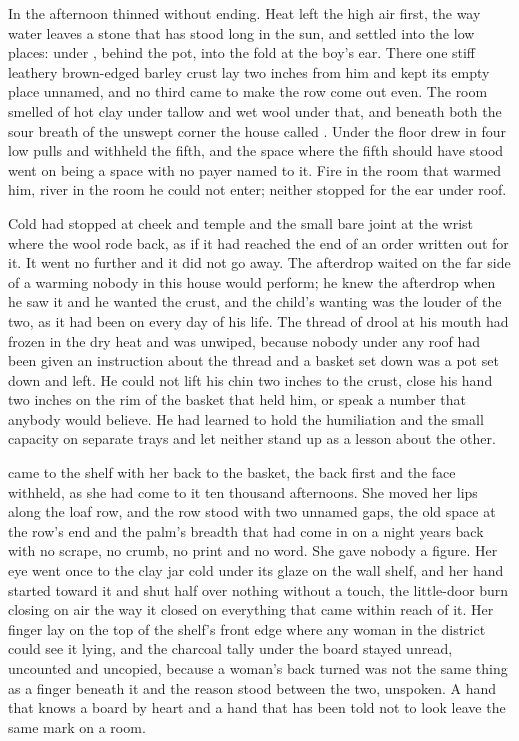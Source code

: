 In  the afternoon thinned without ending. Heat left the high air first, the way water leaves a stone that has stood long in the sun, and settled into the low places: under , behind the pot, into the fold at the boy's ear. There one stiff leathery brown-edged barley crust lay two inches from him and kept its empty place unnamed, and no third came to make the row come out even. The room smelled of hot clay under tallow and wet wool under that, and beneath both the sour  breath of the unswept corner the house called . Under the floor  drew in four low pulls and withheld the fifth, and the space where the fifth should have stood went on being a space with no payer named to it. Fire in the room that warmed him, river in the room he could not enter; neither stopped for the ear under  roof.

Cold had stopped at cheek and temple and the small bare joint at the wrist where the wool rode back, as if it had reached the end of an order written out for it. It went no further and it did not go away. The afterdrop waited on the far side of a warming nobody in this house would perform; he knew the afterdrop when he saw it and he wanted the crust, and the child's wanting was the louder of the two, as it had been on every day of his life. The thread of drool at his mouth had frozen in the dry heat and was unwiped, because nobody under any roof had been given an instruction about the thread and a basket set down was a pot set down and left. He could not lift his chin two inches to the crust, close his hand two inches on the rim of the basket that held him, or speak a number that anybody would believe. He had learned to hold the humiliation and the small capacity on separate trays and let neither stand up as a lesson about the other.

\scenebreak

 came to the shelf with her back to the basket, the back first and the face withheld, as she had come to it ten thousand afternoons. She moved her lips along the loaf row, and the row stood with two unnamed gaps, the old space at the row's end and the palm's breadth that had come in on a night years back with no scrape, no crumb, no print and no word. She gave nobody a figure. Her eye went once to the clay jar cold under its glaze on the wall shelf, and her hand started toward it and shut half over nothing without a touch, the little-door burn closing on air the way it closed on everything that came within reach of it. Her finger lay on the top of the shelf's front edge where any woman in the district could see it lying, and the charcoal tally under the board stayed unread, uncounted and uncopied, because a woman's back turned was not the same thing as a finger beneath it and the reason stood between the two, unspoken. A hand that knows a board by heart and a hand that has been told not to look leave the same mark on a room.

